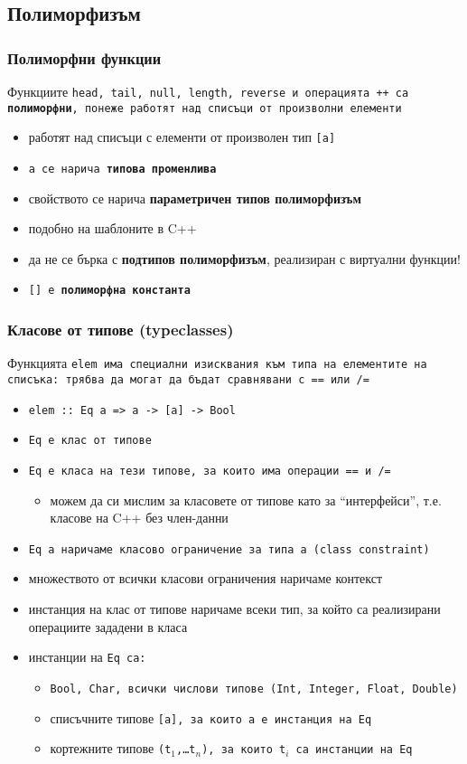 \documentclass{beamer}
\begin{document}
\subsection{Полиморфизъм}

\begin{frame}
  \frametitle{Полиморфни функции}
  Функциите \tt{head}, \tt{tail}, \tt{null}, \tt{length}, \tt{reverse} и операцията \tt{++} са \textbf{полиморфни}, понеже работят над списъци от произволни елементи
  \begin{itemize}[<+->]
  \item работят над списъци с елементи от произволен тип \tt{[a]}
  \item \tt a се нарича \textbf{типова променлива}
  \item свойството се нарича \textbf{параметричен типов полиморфизъм}
  \item подобно на шаблоните в C++
  \item \alert{да не се бърка с \textbf{подтипов полиморфизъм}, реализиран с виртуални функции!}
  \item \tt{[]} е \textbf{полиморфна константа}
  \end{itemize}
\end{frame}

\begin{frame}
  \frametitle{Класове от типове (typeclasses)}
  Функцията \tt{elem} има специални изисквания към типа на елементите на списъка: трябва да могат да бъдат сравнявани с \tt{==} или \tt{/=}
  \begin{itemize}[<+->]
  \item \tt{elem :: \alert{Eq a => }a -> [a] -> Bool}
  \item \tt{Eq} е \alert{клас от типове}
  \item \tt{Eq} е класа на тези типове, за които има операции \tt{==} и \tt{/=}
    \begin{itemize}
    \item можем да си мислим за класовете от типове като за ``интерфейси'', т.е. класове на C++ без член-данни
    \end{itemize}
  \item \tt{Eq a} наричаме \alert{класово ограничение} за типа \tt a (class constraint)
  \item множеството от всички класови ограничения наричаме \alert{контекст}
  \item \alert{инстанция} на клас от типове наричаме всеки тип, за който са реализирани операциите зададени в класа
  \item инстанции на \tt{Eq} са:
    \begin{itemize}
    \item \tt{Bool}, \tt{Char}, всички числови типове (\tt{Int}, \tt{Integer}, \tt{Float}, \tt{Double})
    \item списъчните типове \tt{[a]}, за които \tt a е инстанция на \tt{Eq}
    \item кортежните типове \tt{(t$_1$,\ldots t$_n$)}, за които \tt{t$_i$} са инстанции на \tt{Eq}
    \end{itemize}
  \end{itemize}
\end{frame}
\end{document}

